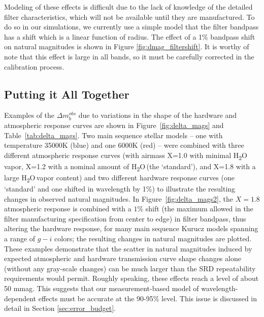 \documentclass[12pt,preprint]{aastex}
\newcommand{\water}   {H\textsubscript{2}O}
\begin{document}
Modeling of these effects is difficult due to the lack of knowledge of the detailed
filter characteristics, which will not be available until they are manufactured.
To do so in our simulations, we currently
use a simple model that the filter bandpass has a shift which is a linear function
of radius.  The effect of a 1\% bandpass shift on natural magnitudes is shown
in Figure \ref{fig:dmag_filtershift}.  It is worthy of note that this effect is
large in all bands, so it must be carefully corrected in the calibration
process.

\subsection{Putting it All Together}
\label{sec:allvars}
Examples of the $\Delta m_b^{obs}$ due to variations in the shape of
the hardware and atmospheric response curves are shown in
Figure~\ref{fig:delta_mags} and Table~\ref{tab:delta_mags}. Two main
sequence stellar models \citep{Kurucz1993} -- one with temperature
35000K (blue) and one 6000K (red) -- were combined with three
different atmospheric response curves (with airmass X=1.0 with minimal
\water\, vapor, X=1.2 with a nominal amount of \water\,(the
`standard'), and X=1.8 with a large \water\,vapor content) and two
different hardware response curves (one `standard' and one shifted in
wavelength by 1\%) to illustrate the resulting changes in observed
natural magnitudes. In Figure~\ref{fig:delta_mags2}, the $X=1.8$
atmospheric response is combined with a $1\%$ shift (the maximum
allowed in the filter manufacturing specification from center to edge)
in filter bandpass, thus altering the hardware response, for many main
sequence Kurucz models spanning a range of $g-i$ colors; the resulting
changes in natural magnitudes are plotted.  These examples demonstrate
that the scatter in natural magnitudes induced by expected atmospheric
and hardware transmission curve shape changes alone (without any
gray-scale changes) can be much larger than the SRD repeatability
requirements would permit. Roughly speaking, these effects reach a level of about 
50 mmag.  This suggests that our measurement-based model of wavelength-dependent
effects must be accurate at the 90-95\% level.  This issue is discussed in detail in Section
\ref{sec:error_budget}.
\end{document}

